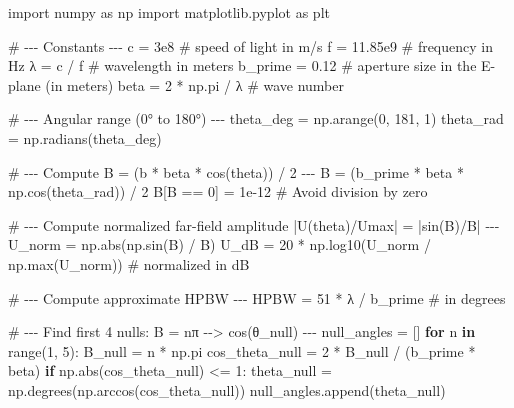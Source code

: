 \documentclass[
  letterpaper,
  DIV=11,
  numbers=noendperiod]{scrartcl}
\newenvironment{Shaded}{\begin{snugshade}}{\end{snugshade}}
\newcommand{\BuiltInTok}[1]{\textcolor[rgb]{0.00,0.23,0.31}{#1}}
\newcommand{\CommentTok}[1]{\textcolor[rgb]{0.37,0.37,0.37}{#1}}
\newcommand{\ControlFlowTok}[1]{\textcolor[rgb]{0.00,0.23,0.31}{\textbf{#1}}}
\newcommand{\DecValTok}[1]{\textcolor[rgb]{0.68,0.00,0.00}{#1}}
\newcommand{\FloatTok}[1]{\textcolor[rgb]{0.68,0.00,0.00}{#1}}
\newcommand{\ImportTok}[1]{\textcolor[rgb]{0.00,0.46,0.62}{#1}}
\newcommand{\KeywordTok}[1]{\textcolor[rgb]{0.00,0.23,0.31}{\textbf{#1}}}
\newcommand{\NormalTok}[1]{\textcolor[rgb]{0.00,0.23,0.31}{#1}}
\newcommand{\OperatorTok}[1]{\textcolor[rgb]{0.37,0.37,0.37}{#1}}
\begin{document}
\begin{Shaded}
\begin{Highlighting}[]
\ImportTok{import}\NormalTok{ numpy }\ImportTok{as}\NormalTok{ np}
\ImportTok{import}\NormalTok{ matplotlib.pyplot }\ImportTok{as}\NormalTok{ plt}

\CommentTok{\# {-}{-}{-} Constants {-}{-}{-}}
\NormalTok{c }\OperatorTok{=} \FloatTok{3e8}  \CommentTok{\# speed of light in m/s}
\NormalTok{f }\OperatorTok{=} \FloatTok{11.85e9}  \CommentTok{\# frequency in Hz}
\NormalTok{λ }\OperatorTok{=}\NormalTok{ c }\OperatorTok{/}\NormalTok{ f  }\CommentTok{\# wavelength in meters}
\NormalTok{b\_prime }\OperatorTok{=} \FloatTok{0.12}  \CommentTok{\# aperture size in the E{-}plane (in meters)}
\NormalTok{beta }\OperatorTok{=} \DecValTok{2} \OperatorTok{*}\NormalTok{ np.pi }\OperatorTok{/}\NormalTok{ λ  }\CommentTok{\# wave number}

\CommentTok{\# {-}{-}{-} Angular range (0° to 180°) {-}{-}{-}}
\NormalTok{theta\_deg }\OperatorTok{=}\NormalTok{ np.arange(}\DecValTok{0}\NormalTok{, }\DecValTok{181}\NormalTok{, }\DecValTok{1}\NormalTok{)}
\NormalTok{theta\_rad }\OperatorTok{=}\NormalTok{ np.radians(theta\_deg)}

\CommentTok{\# {-}{-}{-} Compute B = (b\textquotesingle{} * beta * cos(theta)) / 2 {-}{-}{-}}
\NormalTok{B }\OperatorTok{=}\NormalTok{ (b\_prime }\OperatorTok{*}\NormalTok{ beta }\OperatorTok{*}\NormalTok{ np.cos(theta\_rad)) }\OperatorTok{/} \DecValTok{2}
\NormalTok{B[B }\OperatorTok{==} \DecValTok{0}\NormalTok{] }\OperatorTok{=} \FloatTok{1e{-}12}  \CommentTok{\# Avoid division by zero}

\CommentTok{\# {-}{-}{-} Compute normalized far{-}field amplitude |U(theta)/Umax| = |sin(B)/B| {-}{-}{-}}
\NormalTok{U\_norm }\OperatorTok{=}\NormalTok{ np.}\BuiltInTok{abs}\NormalTok{(np.sin(B) }\OperatorTok{/}\NormalTok{ B)}
\NormalTok{U\_dB }\OperatorTok{=} \DecValTok{20} \OperatorTok{*}\NormalTok{ np.log10(U\_norm }\OperatorTok{/}\NormalTok{ np.}\BuiltInTok{max}\NormalTok{(U\_norm))  }\CommentTok{\# normalized in dB}

\CommentTok{\# {-}{-}{-} Compute approximate HPBW {-}{-}{-}}
\NormalTok{HPBW }\OperatorTok{=} \DecValTok{51} \OperatorTok{*}\NormalTok{ λ }\OperatorTok{/}\NormalTok{ b\_prime  }\CommentTok{\# in degrees}

\CommentTok{\# {-}{-}{-} Find first 4 nulls: B = nπ {-}{-}\textgreater{} cos(θ\_null) {-}{-}{-}}
\NormalTok{null\_angles }\OperatorTok{=}\NormalTok{ []}
\ControlFlowTok{for}\NormalTok{ n }\KeywordTok{in} \BuiltInTok{range}\NormalTok{(}\DecValTok{1}\NormalTok{, }\DecValTok{5}\NormalTok{):}
\NormalTok{    B\_null }\OperatorTok{=}\NormalTok{ n }\OperatorTok{*}\NormalTok{ np.pi}
\NormalTok{    cos\_theta\_null }\OperatorTok{=} \DecValTok{2} \OperatorTok{*}\NormalTok{ B\_null }\OperatorTok{/}\NormalTok{ (b\_prime }\OperatorTok{*}\NormalTok{ beta)}
    \ControlFlowTok{if}\NormalTok{ np.}\BuiltInTok{abs}\NormalTok{(cos\_theta\_null) }\OperatorTok{\textless{}=} \DecValTok{1}\NormalTok{:}
\NormalTok{        theta\_null }\OperatorTok{=}\NormalTok{ np.degrees(np.arccos(cos\_theta\_null))}
\NormalTok{        null\_angles.append(theta\_null)}


\end{Highlighting}
\end{Shaded}
\end{document}
